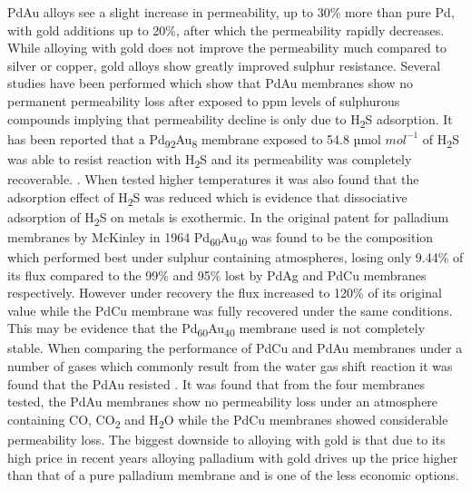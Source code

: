PdAu alloys see a slight increase in permeability,  up to 30\% more than pure Pd, with gold 
additions up to 20\%, after which the permeability rapidly decreases. While alloying with 
gold does not improve the permeability much compared to silver or copper, gold alloys show 
greatly improved sulphur resistance. Several studies have been performed which show that PdAu 
membranes show no permanent permeability loss after exposed to ppm levels of sulphurous 
compounds implying that permeability decline is only due to H\textsubscript{2}S adsorption. 
It has been reported that a Pd\textsubscript{92}Au\textsubscript{8} membrane exposed to 
54.8 µmol $mol^{-1}$ of H\textsubscript{2}S was able to resist reaction with H\textsubscript{2}S and its permeability was 
completely recoverable. \cite{Chen2010}. When tested higher temperatures it was also found that the 
adsorption effect of H\textsubscript{2}S was reduced which is evidence that dissociative adsorption of H\textsubscript{2}S 
on metals is exothermic. \cite{Chen2010} In the original patent for palladium membranes by  McKinley \cite{DavidL.McKinley1964} 
in 1964 Pd\textsubscript{60}Au\textsubscript{40} was found to be the composition which performed best under sulphur 
containing atmospheres, losing only 9.44\% of its flux compared to the 99\% and 95\% lost by 
PdAg and PdCu membranes respectively.\cite{DavidL.McKinley1964} However under recovery the flux increased to 120\% 
of its original value while the PdCu membrane was fully recovered under the same conditions. 
This may be evidence that the Pd\textsubscript{60}Au\textsubscript{40} membrane used is not completely stable. \cite{DavidL.McKinley1964} When 
comparing the performance of PdCu and PdAu membranes under a number of gases which commonly 
result from the water gas shift reaction it was found that the PdAu resisted . \cite{RoaF.ThoenP.M.GadeS.K.WayJ.G.DeVossS.andAlptekin2009} 
It was found that from the four membranes tested, the PdAu membranes show no permeability 
loss under an atmosphere containing CO, CO\textsubscript{2} and H\textsubscript{2}O while the PdCu membranes showed 
considerable permeability loss. \cite{RoaF.ThoenP.M.GadeS.K.WayJ.G.DeVossS.andAlptekin2009} The biggest downside to alloying with gold is that 
due to its high price in recent years alloying palladium with gold drives up the price 
higher than that of a pure palladium membrane and is one of the less economic options. \cite{APMEX2016}

